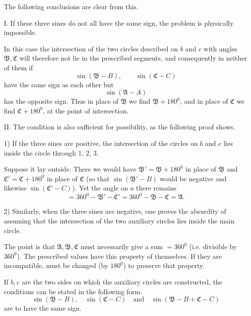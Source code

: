 
The following conclusions are clear from this.

I. If these three sines do not all have the same sign, the problem is physically impossible.

In this case the intersection of the two circles described on $b$ and $c$ with angles $\mathfrak{B}, \mathfrak{C}$ will therefore not lie in the prescribed segments, and consequently in neither of them if
\[ \sin(\mathfrak{B}-B), \qquad \sin(\mathfrak{C}-C) \]
have the same sign as each other but
\[ \sin(\mathfrak{A}-A) \]
has the opposite sign. Thus in place of $\mathfrak{B}$ we find $\mathfrak{B}+180^0$, and in place of $\mathfrak{C}$ we find $\mathfrak{C}+180^0$, at the point of intersection.

II. The condition is also sufficient for possibility, as the following proof shows.

1) If the three sines are positive, the intersection of the circles on $b$ and $c$ lies inside the circle through 1, 2, 3.

 Suppose it lay outside. There we would have $\mathfrak{B}' = \mathfrak{B}+180^0$ in place of $\mathfrak{B}$ and $\mathfrak{C}' = \mathfrak{C}+180^0$ in place of $\mathfrak{C}$ (so that $\sin(\mathfrak{B}'-B)$ would be negative and likewise $\sin(\mathfrak{C}'-C)$). Yet the angle on $a$ there remains
\[ =360^0-\mathfrak{B}'-\mathfrak{C}'=360^0-\mathfrak{B}-\mathfrak{C}=\mathfrak{A}. \]

2) Similarly, when the three sines are negative, one proves the absurdity of assuming that the intersection of the two auxiliary circles lies inside the main circle.

The point is that $\mathfrak{A}, \mathfrak{B}, \mathfrak{C}$ must necessarily give a sum $=360^0$ (i.e. divisible by $360^0$). The prescribed values have this property of themselves. If they are incompatible,  must be changed (by $180^0$) to preserve that property.

If $b, c$ are the two sides on which the auxiliary circles are constructed, the conditions can be stated in the following form.
\[ \sin(\mathfrak{B}-B), \quad \sin(\mathfrak{C}-C) \quad \text{and} \quad \sin(\mathfrak{B}-B+\mathfrak{C}-C) \]
are to have the same sign.
